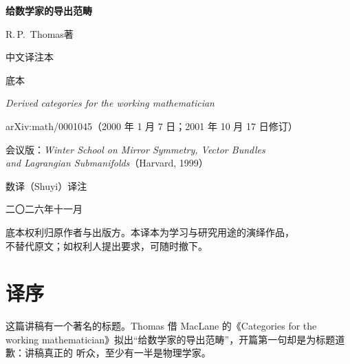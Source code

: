 
\begin{titlepage}
\centering
\vspace*{2.6cm}

{\Huge\bfseries 给数学家的导出范畴\par}

\vspace{1.1cm}
{\Large R.\,P.~Thomas\quad 著\par}
\vspace{0.35cm}
{\large 中文译注本\par}

\vspace{2.2cm}
{\large 底本\par}
\vspace{0.3cm}
{\large\itshape Derived categories for the working mathematician\par}
\vspace{0.5cm}
{\large arXiv:math/0001045\quad（2000 年 1 月 7 日；2001 年 10 月 17 日修订）\par}
\vspace{0.3cm}
{\large 会议版：\emph{Winter School on Mirror Symmetry, Vector Bundles\\[2pt]
and Lagrangian Submanifolds}（Harvard, 1999）\par}

\vfill
{\large 数译（Shuyi）\quad 译注\par}
\vspace{0.3cm}
{\large 二〇二六年十一月\par}
\vspace{1.2cm}
{\footnotesize
底本权利归原作者与出版方。本译本为学习与研究用途的演绎作品，\\
不替代原文；如权利人提出要求，可随时撤下。\par}
\end{titlepage}

\thispagestyle{plain}
\section*{译序}

这篇讲稿有一个著名的标题。Thomas 借 MacLane 的《Categories for the working
mathematician》拟出“给数学家的导出范畴”，开篇第一句却是为标题道歉：讲稿真正的
听众，至少有一半是物理学家。

